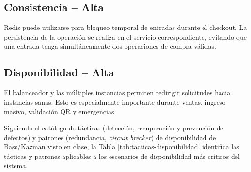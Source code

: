 \documentclass[12pt,a4paper]{article}
\begin{document}
\subsection{Consistencia -- Alta}

Redis puede utilizarse para bloqueo temporal de entradas durante el checkout. La persistencia de la operación se realiza en el servicio correspondiente, evitando que una entrada tenga simultáneamente dos operaciones de compra válidas.

\subsection{Disponibilidad -- Alta}

El balanceador y las múltiples instancias permiten redirigir solicitudes hacia instancias sanas. Esto es especialmente importante durante ventas, ingreso masivo, validación QR y emergencias.

Siguiendo el catálogo de tácticas (detección, recuperación y prevención de defectos) y patrones (redundancia, \textit{circuit breaker}) de disponibilidad de Bass/Kazman visto en clase, la Tabla \ref{tab:tacticas-disponibilidad} identifica las tácticas y patrones aplicables a los escenarios de disponibilidad más críticos del sistema.
\end{document}
